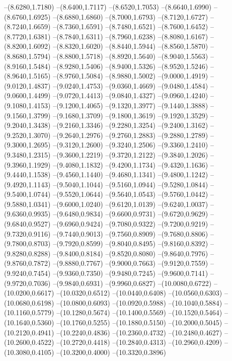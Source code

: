 {\begin{scope}
--(8.6280,1.7180)
--(8.6400,1.7117)
--(8.6520,1.7053)
--(8.6640,1.6990)
--(8.6760,1.6925)
--(8.6880,1.6860)
--(8.7000,1.6793)
--(8.7120,1.6727)
--(8.7240,1.6659)
--(8.7360,1.6591)
--(8.7480,1.6521)
--(8.7600,1.6452)
--(8.7720,1.6381)
--(8.7840,1.6311)
--(8.7960,1.6238)
--(8.8080,1.6167)
--(8.8200,1.6092)
--(8.8320,1.6020)
--(8.8440,1.5944)
--(8.8560,1.5870)
--(8.8680,1.5794)
--(8.8800,1.5718)
--(8.8920,1.5640)
--(8.9040,1.5563)
--(8.9160,1.5484)
--(8.9280,1.5406)
--(8.9400,1.5326)
--(8.9520,1.5246)
--(8.9640,1.5165)
--(8.9760,1.5084)
--(8.9880,1.5002)
--(9.0000,1.4919)
--(9.0120,1.4837)
--(9.0240,1.4753)
--(9.0360,1.4669)
--(9.0480,1.4584)
--(9.0600,1.4499)
--(9.0720,1.4413)
--(9.0840,1.4327)
--(9.0960,1.4240)
--(9.1080,1.4153)
--(9.1200,1.4065)
--(9.1320,1.3977)
--(9.1440,1.3888)
--(9.1560,1.3799)
--(9.1680,1.3709)
--(9.1800,1.3619)
--(9.1920,1.3529)
--(9.2040,1.3438)
--(9.2160,1.3346)
--(9.2280,1.3254)
--(9.2400,1.3162)
--(9.2520,1.3070)
--(9.2640,1.2976)
--(9.2760,1.2883)
--(9.2880,1.2789)
--(9.3000,1.2695)
--(9.3120,1.2600)
--(9.3240,1.2506)
--(9.3360,1.2410)
--(9.3480,1.2315)
--(9.3600,1.2219)
--(9.3720,1.2122)
--(9.3840,1.2026)
--(9.3960,1.1929)
--(9.4080,1.1832)
--(9.4200,1.1734)
--(9.4320,1.1636)
--(9.4440,1.1538)
--(9.4560,1.1440)
--(9.4680,1.1341)
--(9.4800,1.1242)
--(9.4920,1.1143)
--(9.5040,1.1044)
--(9.5160,1.0944)
--(9.5280,1.0844)
--(9.5400,1.0744)
--(9.5520,1.0644)
--(9.5640,1.0543)
--(9.5760,1.0442)
--(9.5880,1.0341)
--(9.6000,1.0240)
--(9.6120,1.0139)
--(9.6240,1.0037)
--(9.6360,0.9935)
--(9.6480,0.9834)
--(9.6600,0.9731)
--(9.6720,0.9629)
--(9.6840,0.9527)
--(9.6960,0.9424)
--(9.7080,0.9322)
--(9.7200,0.9219)
--(9.7320,0.9116)
--(9.7440,0.9013)
--(9.7560,0.8909)
--(9.7680,0.8806)
--(9.7800,0.8703)
--(9.7920,0.8599)
--(9.8040,0.8495)
--(9.8160,0.8392)
--(9.8280,0.8288)
--(9.8400,0.8184)
--(9.8520,0.8080)
--(9.8640,0.7976)
--(9.8760,0.7872)
--(9.8880,0.7767)
--(9.9000,0.7663)
--(9.9120,0.7559)
--(9.9240,0.7454)
--(9.9360,0.7350)
--(9.9480,0.7245)
--(9.9600,0.7141)
--(9.9720,0.7036)
--(9.9840,0.6931)
--(9.9960,0.6827)
--(10.0080,0.6722)
--(10.0200,0.6617)
--(10.0320,0.6512)
--(10.0440,0.6408)
--(10.0560,0.6303)
--(10.0680,0.6198)
--(10.0800,0.6093)
--(10.0920,0.5988)
--(10.1040,0.5884)
--(10.1160,0.5779)
--(10.1280,0.5674)
--(10.1400,0.5569)
--(10.1520,0.5464)
--(10.1640,0.5360)
--(10.1760,0.5255)
--(10.1880,0.5150)
--(10.2000,0.5045)
--(10.2120,0.4941)
--(10.2240,0.4836)
--(10.2360,0.4732)
--(10.2480,0.4627)
--(10.2600,0.4522)
--(10.2720,0.4418)
--(10.2840,0.4313)
--(10.2960,0.4209)
--(10.3080,0.4105)
--(10.3200,0.4000)
--(10.3320,0.3896)

\end{scope}}
